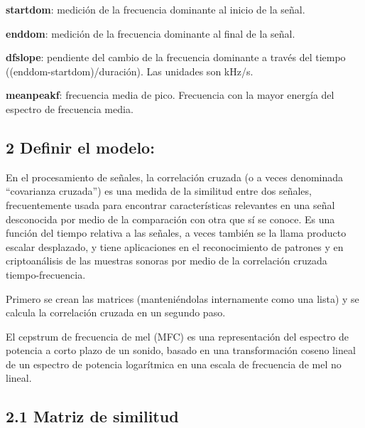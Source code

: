 \documentclass[
]{article}
\begin{document}
\textbf{startdom}: medición de la frecuencia dominante al inicio de la
señal.

\vspace{6pt}

\textbf{enddom}: medición de la frecuencia dominante al final de la
señal.

\vspace{6pt}

\textbf{dfslope}: pendiente del cambio de la frecuencia dominante a
través del tiempo ((enddom-startdom)/duración). Las unidades son kHz/s.

\vspace{6pt}

\textbf{meanpeakf}: frecuencia media de pico. Frecuencia con la mayor
energía del espectro de frecuencia media.

\vspace{6pt}

\hypertarget{definir-el-modelo}{%
\subsection{2 Definir el modelo:}\label{definir-el-modelo}}

En el procesamiento de señales, la correlación cruzada (o a veces
denominada ``covarianza cruzada'') es una medida de la similitud entre
dos señales, frecuentemente usada para encontrar características
relevantes en una señal desconocida por medio de la comparación con otra
que sí se conoce. Es una función del tiempo relativa a las señales, a
veces también se la llama producto escalar desplazado, y tiene
aplicaciones en el reconocimiento de patrones y en criptoanálisis de las
muestras sonoras por medio de la correlación cruzada tiempo-frecuencia.

Primero se crean las matrices (manteniéndolas internamente como una
lista) y se calcula la correlación cruzada en un segundo paso.

El cepstrum de frecuencia de mel (MFC) es una representación del
espectro de potencia a corto plazo de un sonido, basado en una
transformación coseno lineal de un espectro de potencia logarítmica en
una escala de frecuencia de mel no lineal. \newpage

\hypertarget{matriz-de-similitud}{%
\subsection{2.1 Matriz de similitud}\label{matriz-de-similitud}}
\end{document}
